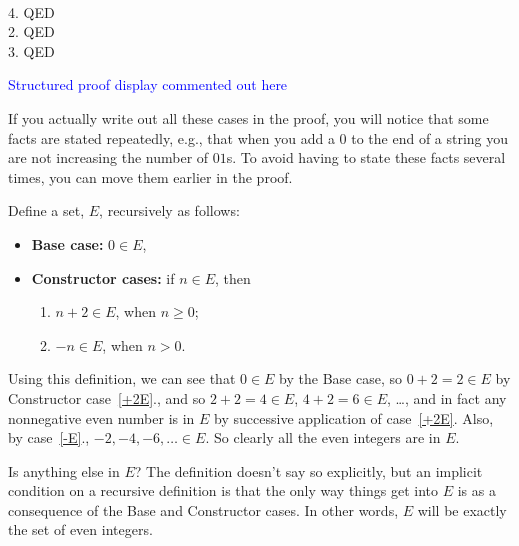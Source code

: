 \begin{definition}
\begin{staffnotes}
{ \\
  4. QED 
   \\
  2. QED
   \\
  3. QED 
  \\
}
\fi

\textcolor{blue}{Structured proof display commented out here}

If you actually write out all these cases in the proof, you will
notice that some facts are stated repeatedly, e.g., that when you add
a $0$ to the end of a string you are not increasing the number of
$01$s.  To avoid having to state these facts several times, you can
move them earlier in the proof.

\end{staffnotes}


\begin{staffnotes}

\begin{example*}
\begin{definition}\label{E}
Define a set, $E$, recursively as follows:
\begin{itemize}
\item \textbf{Base case:} $0 \in E$,\label{0E}
\item \textbf{Constructor cases:} if $n \in E$, then
\begin{enumerate}
\item $n+2 \in E$, when $n\geq 0$;\label{+2E}
\item $-n \in E$, when $n > 0$.\label{-E}
\end{enumerate}
\end{itemize}

\end{definition}
\end{example*}

Using this definition, we can see that $0 \in E$ by the Base case, so $0 +
2 = 2 \in E$ by Constructor case~\ref{+2E}., and so $2+2 =4 \in E$, $4+2 =
6 \in E$, \dots, and in fact any nonnegative even number is in $E$ by
successive application of case~\ref{+2E}.  Also, by case~\ref{-E}.,
$-2,-4,-6,\dots \in E$.  So clearly all the even integers are in $E$.

Is anything else in $E$?  The definition doesn't say so explicitly, but an
implicit condition on a recursive definition is that the only way things
get into $E$ is as a consequence of the Base and Constructor cases.  In
other words, $E$ will be exactly the set of even integers.


\end{staffnotes}
\end{definition}
